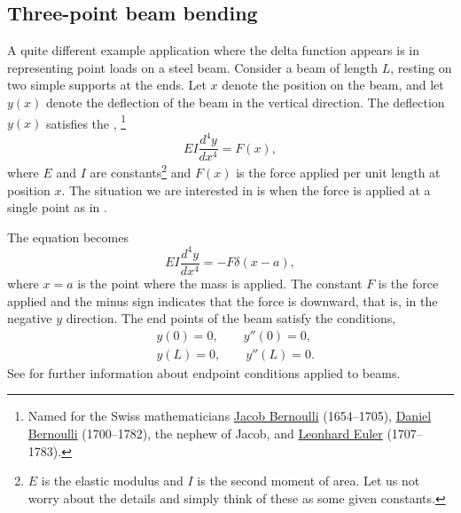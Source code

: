 \subsection{Three-point beam bending}

A quite different
example application where the delta function appears is in
representing point loads on a steel beam.  Consider a beam
of length $L$, resting on two simple supports at the ends.  Let $x$ denote
the position on the beam, and let $y(x)$ denote the deflection of the beam in
the vertical direction.  The deflection $y(x)$ satisfies the
\emph{},%
\footnote{Named for the Swiss mathematicians
\href{https://en.wikipedia.org/wiki/Jacob_Bernoulli}{Jacob Bernoulli}
(1654--1705),
\href{https://en.wikipedia.org/wiki/Daniel_Bernoulli}{Daniel Bernoulli}
(1700--1782), the nephew of Jacob,
and
\href{https://en.wikipedia.org/wiki/Leonhard_Euler}{Leonhard Euler}
(1707--1783).}
\begin{equation*}
EI \frac{d^4 y}{dx^4} = F(x) ,
\end{equation*}
where $E$ and $I$ are constants\footnote{$E$ is the elastic modulus and $I$
is the second moment of area.  Let us not worry about the details and simply
think of these as some given constants.} and
$F(x)$ is the force applied per unit length at position $x$.  The situation
we are interested in is when the force is applied at a single point as in
.

\begin{myfig}
\capstart
{}
\caption{Three-point bending.\label{lt:beambendingfig}}
\end{myfig}

The equation becomes
\begin{equation*}
EI \frac{d^4 y}{dx^4} = -F \delta(x-a) ,
\end{equation*}
where $x=a$ is the point where the mass is applied.  The constant $F$ is the force
applied and the minus sign indicates that the force is downward, that is, in the
negative $y$ direction.  The end points of the
beam satisfy the conditions,
\begin{align*}
& y(0) = 0, \qquad y''(0) = 0, \\
& y(L) = 0, \qquad y''(L) = 0.
\end{align*}
See  for further information about endpoint
conditions applied to beams.


